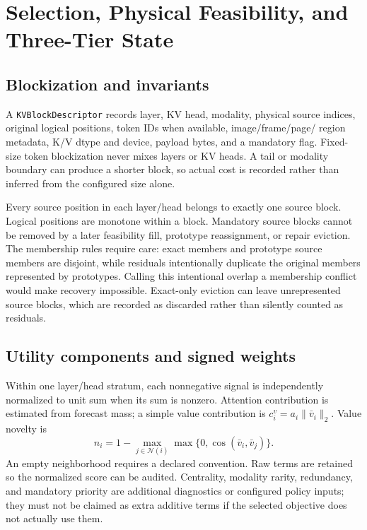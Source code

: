 \section{Selection, Physical Feasibility, and Three-Tier State}
\label{app:selection}
\subsection{Blockization and invariants}
A \texttt{KVBlockDescriptor} records layer, KV head, modality, physical source
indices, original logical positions, token IDs when available, image/frame/page/
region metadata, K/V dtype and device, payload bytes, and a mandatory flag.
Fixed-size token blockization never mixes layers or KV heads. A tail or
modality boundary can produce a shorter block, so actual cost is recorded
rather than inferred from the configured size alone.

Every source position in each layer/head belongs to exactly one source block.
Logical positions are monotone within a block. Mandatory source blocks cannot
be removed by a later feasibility fill, prototype reassignment, or repair
eviction. The membership rules require care: exact members and prototype
source members are disjoint, while residuals intentionally duplicate the
original members represented by prototypes. Calling this intentional overlap
a membership conflict would make recovery impossible. Exact-only eviction can
leave unrepresented source blocks, which are recorded as discarded rather
than silently counted as residuals.

\subsection{Utility components and signed weights}
Within one layer/head stratum, each nonnegative signal is independently
normalized to unit sum when its sum is nonzero. Attention contribution is
estimated from forecast mass; a simple value contribution is
$c_i^v=a_i\lVert\bar v_i\rVert_2$. Value novelty is
\begin{equation}
 n_i=1-\max_{j\in\mathcal N(i)}\max\{0,\cos(\bar v_i,\bar v_j)\}.
\end{equation}
An empty neighborhood requires a declared convention. Raw terms are retained
so the normalized score can be audited. Centrality, modality rarity, redundancy,
and mandatory priority are additional diagnostics or configured policy inputs;
they must not be claimed as extra additive terms if the selected objective
does not actually use them.

